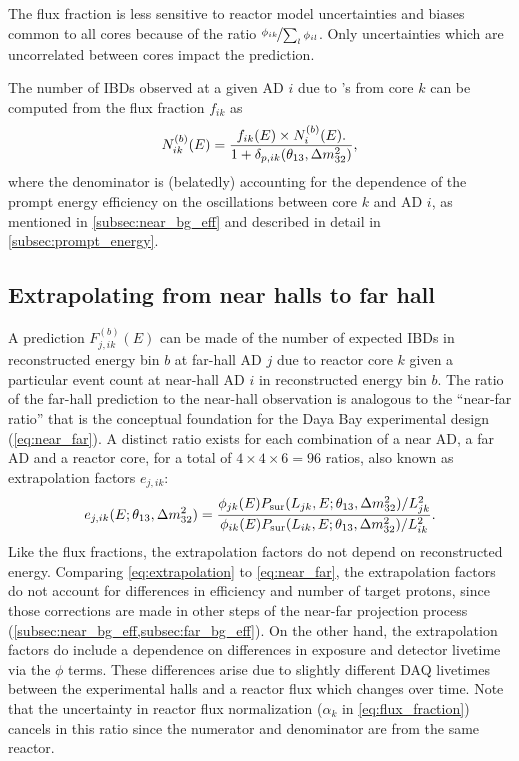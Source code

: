The flux fraction is less sensitive to reactor \nuebar{} model uncertainties and biases
common to all cores
because of the ratio $\nicefrac{\phi_{ik}}{\sum_l\phi_{il}}$.
Only uncertainties which are uncorrelated between cores
impact the prediction.

The number of IBDs observed at a given AD $i$ due to \nuebar{}'s from core $k$
can be computed from the flux fraction $f_{ik}$ as
\begin{equation}\label{eq:num_ibds_from_core_ij}
    N_{ik}^{(b)}(E) = \frac{
        f_{ik}(E) \times N_i^{(b)}(E).
    }{
        1 + \delta_{p,ik}(\theta_{13}, \Delta m^2_{32})
    },
\end{equation}
where the denominator is (belatedly) accounting for the dependence
of the prompt energy efficiency on the \nuebar{} oscillations
between core $k$ and AD $i$,
as mentioned in \cref{subsec:near_bg_eff}
and described in detail in \cref{subsec:prompt_energy}.

\subsection{Extrapolating from near halls to far hall}
\label{subsec:extrapolation}

A prediction $F_{j,ik}^{(b)}(E)$ can be made of the number of expected IBDs
in reconstructed energy bin $b$
at far-hall AD $j$ due to reactor core $k$
given a particular event count at near-hall AD $i$ in reconstructed energy bin $b$.
The ratio of the far-hall prediction to the near-hall observation
is analogous to the ``near-far ratio''
that is the conceptual foundation
for the Daya Bay experimental design (\cref{eq:near_far}).
A distinct ratio exists for each combination of a near AD, a far AD and a reactor core,
for a total of $4 \times 4 \times 6 = 96$ ratios, also known as extrapolation factors
$e_{j,ik}$:
\begin{equation}\label{eq:extrapolation}
    e_{j,ik}(E;\theta_{13},\Delta m^2_{32}) = \frac{
        \phi_{jk}(E)P_\text{sur}(L_{jk}, E;\theta_{13},\Delta m^2_{32})/L_{jk}^2}{
        \phi_{ik}(E)P_\text{sur}(L_{ik}, E;\theta_{13},\Delta m^2_{32})/L_{ik}^2
    }.
\end{equation}
Like the flux fractions, the extrapolation factors
do not depend on reconstructed energy.
Comparing \cref{eq:extrapolation} to \cref{eq:near_far}, the extrapolation factors
do not account for differences in efficiency and number of target protons,
since those corrections are made in other steps of the near-far projection process
(\cref{subsec:near_bg_eff,subsec:far_bg_eff}).
On the other hand, the extrapolation factors do include a dependence on
differences in \nuebar{} exposure and detector livetime via the $\phi$ terms.
These differences arise due to slightly different DAQ livetimes
between the experimental halls
and a reactor flux which changes over time.
Note that the uncertainty in reactor flux normalization
($\alpha_k$ in \cref{eq:flux_fraction})
cancels in this ratio since the numerator and denominator are from the same reactor.

